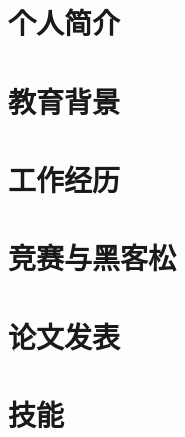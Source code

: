\documentclass[UTF8,10pt,fontset=windows]{ctexart}
\begin{document}
\fontsize{8.8pt}{9.6pt}\selectfont
\section{个人简介}


\section{教育背景}


\section{工作经历}


\section{竞赛与黑客松}


\section{论文发表}


\section{技能}

\end{document}
